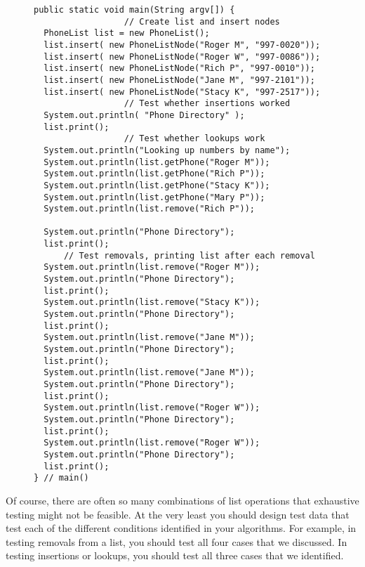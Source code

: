 \begin{figure}[h!]
\jjjprogstart
\begin{jjjlisting}
\begin{lstlisting}
public static void main(String argv[]) {
                  // Create list and insert nodes
  PhoneList list = new PhoneList();
  list.insert( new PhoneListNode("Roger M", "997-0020"));
  list.insert( new PhoneListNode("Roger W", "997-0086"));
  list.insert( new PhoneListNode("Rich P", "997-0010"));
  list.insert( new PhoneListNode("Jane M", "997-2101"));
  list.insert( new PhoneListNode("Stacy K", "997-2517"));
                  // Test whether insertions worked
  System.out.println( "Phone Directory" );
  list.print();
                  // Test whether lookups work
  System.out.println("Looking up numbers by name");
  System.out.println(list.getPhone("Roger M"));
  System.out.println(list.getPhone("Rich P"));
  System.out.println(list.getPhone("Stacy K"));
  System.out.println(list.getPhone("Mary P"));
  System.out.println(list.remove("Rich P"));

  System.out.println("Phone Directory");
  list.print();
      // Test removals, printing list after each removal
  System.out.println(list.remove("Roger M"));
  System.out.println("Phone Directory");
  list.print();
  System.out.println(list.remove("Stacy K"));
  System.out.println("Phone Directory");
  list.print();
  System.out.println(list.remove("Jane M"));
  System.out.println("Phone Directory");
  list.print();
  System.out.println(list.remove("Jane M"));
  System.out.println("Phone Directory");
  list.print();
  System.out.println(list.remove("Roger W"));
  System.out.println("Phone Directory");
  list.print();
  System.out.println(list.remove("Roger W"));
  System.out.println("Phone Directory");
  list.print();
} // main()
\end{lstlisting}
\end{jjjlisting}
\end{figure}
\noindent Of course, there are often so many combinations of list operations
that exhaustive testing might not be feasible.  At the very least you
should design test data that test each of the different conditions
identified in your algorithms.  For example, in testing removals from
a list, you should test all four cases that we discussed.  In testing
insertions or lookups, you should test all three cases that we
identified.



